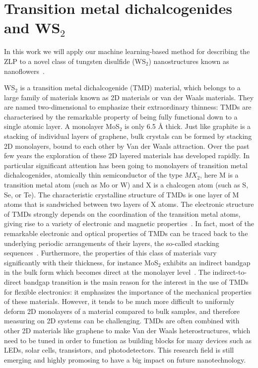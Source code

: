 \section{Transition metal dichalcogenides and WS$_2$}
\label{sec:tmd}

In this work we will apply our machine learning-based method
for describing the ZLP to a novel class of tungsten disulfide (WS$_2$) nanostructures known
as nanoflowers~\cite{SabryaWS2}.

WS$_2$ is a transition metal dichalcogenide (TMD) material, which 
belongs to a large family of materials known as 2D materials or van der Waals materials.
%
They are named two-dimensional to emphasize their extraordinary thinness: 
TMDs are characterised by the remarkable property of being fully 
functional down to a single atomic layer.
%
A monolayer MoS$_2$ is only 6.5 Å thick. 
%
Just like graphite is a stacking of individual layers of graphene,
bulk crystals can be formed by stacking 2D monolayers, 
 bound to each other by Van der Waals attraction. 
%
Over the past few years the exploration of these 2D layered materials
 has developed rapidly. 
 In particular significant attention has been 
 going to monolayers of transition metal dichalcogenides,
 atomically thin semiconductor of the type $MX_2$, here M is a 
transition metal atom (such as Mo or W) and X is a chalcogen atom (such as S, Se, or Te). 
The characteristic crystalline structure of TMDs is one layer of M atoms 
that is sandwiched between two layers of X atoms.
The electronic structure of TMDs strongly depends on the coordination 
 of the transition metal atoms, giving rise to a variety of electronic
 and magnetic properties~\cite{Chhowalla:2013}.
In fact, most of the remarkable electronic and optical properties of TMDs
can be traced back to the underlying periodic arrangements of their layers, 
the so-called stacking sequences~\cite{SabryaWS2}.
%
Furthermore, the properties of this class of materials vary significantly
with their thickness, for instance MoS$_2$ exhibits an indirect bandgap
in the bulk form which becomes direct at the monolayer level~\cite{Splendiani:2010}.
%
The indirect-to-direct bandgap transition is the main reason for the interest in 
the use of TMDs for flexible electronics: it emphasizes the importance of the
mechanical properties of these materials. 
%
However, it tends to be much more difficult to uniformly deform 2D monolayers
of a material compared to bulk samples, and therefore measuring on 2D systems
can be challenging.
%
TMDs are often combined with other 2D materials like graphene
to make Van der Waals heterostructures, which need to be tuned in order
to function as building blocks for many devices such as LEDs, solar cells, 
transistors, and photodetectors.
%
This research field is still emerging and highly promosing to have a big
impact on future nanotechnology. \\
 
